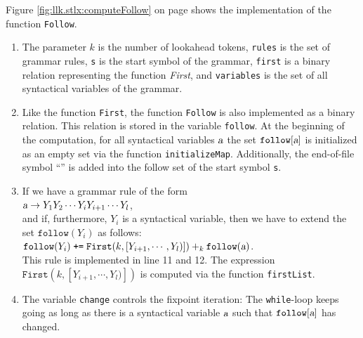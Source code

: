 \noindent
Figure \ref{fig:llk.stlx:computeFollow} on page \pageref{fig:llk.stlx:computeFollow} shows the
implementation of the function \texttt{Follow}.  
\begin{enumerate}
\item The parameter $k$ is the number of lookahead tokens, \texttt{rules} is the set of grammar
      rules, \texttt{s} is the start symbol of the grammar, \texttt{first} is a binary relation
      representing the function \textsl{First}, and \texttt{variables} is the set of all syntactical
      variables of the grammar.
\item Like the function \texttt{First}, the function \texttt{Follow} is also implemented as a binary
      relation.  This relation is stored in the variable \texttt{follow}.  At the beginning of the
      computation, for all syntactical variables $\textsl{a}$ the set $\texttt{follow}[\textsl{a}]$ is initialized as
      an empty set via the function 
      \texttt{initializeMap}.   Additionally, the end-of-file symbol ``\texttt{}'' is
      added into the follow set of the start symbol \texttt{s}.
\item If we have a grammar rule of the form
      \\[0.2cm]
      \hspace*{1.3cm}
      $\textsl{a} \rightarrow Y_1 Y_2 \cdots Y_i Y_{i+1} \cdots Y_l$,
      \\[0.2cm]
      and if, furthermore, $Y_i$ is a syntactical variable, then we have to extend the set
      $\texttt{follow}(Y_i)$ as follows:
      \\[0.2cm]
      \hspace*{1.3cm}
      $\texttt{follow}(Y_i) \;\texttt{+=}\; \texttt{First}(k, [Y_{i+1}, \cdots, Y_l)]) +_k \texttt{follow}(\textsl{a})$.
      \\[0.2cm]
      This rule is implemented in line 11 and 12.  The expression $\texttt{First}(k, [Y_{i+1},\cdots, Y_l)])$ 
      is computed via the function \texttt{firstList}.
\item The variable \texttt{change} controls the fixpoint iteration: The \texttt{while}-loop keeps
      going as long as there is a syntactical variable $\textsl{a}$ such that $\mathtt{follow}[\textsl{a}]$ has changed.
\end{enumerate}


